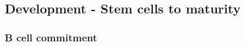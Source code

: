 \subsection{Development - Stem cells to maturity}
\label{subsec:Bcelldevelopment}
\subsubsection{B cell commitment}





